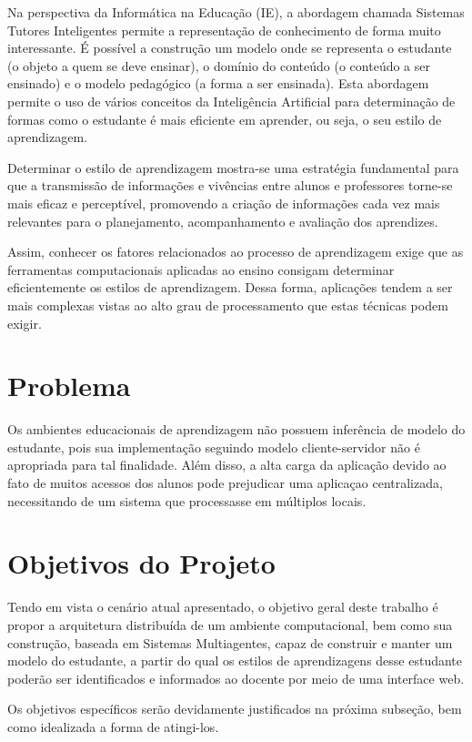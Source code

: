 Na perspectiva da Informática na Educação (IE), a abordagem chamada Sistemas Tutores Inteligentes permite a representação de conhecimento de forma muito interessante. É possível a construção um modelo onde se representa o estudante (o objeto a quem se deve ensinar), o domínio do conteúdo (o conteúdo a ser ensinado) e o modelo pedagógico (a forma a ser ensinada). Esta abordagem permite o uso de vários conceitos da Inteligência Artificial para determinação de formas como o estudante é mais eficiente em aprender, ou seja, o seu estilo de aprendizagem. 

Determinar o estilo de aprendizagem mostra-se uma estratégia fundamental para que a transmissão de informações e vivências entre alunos e professores torne-se mais eficaz e perceptível, promovendo a criação de informações cada vez mais relevantes para o planejamento, acompanhamento e avaliação dos aprendizes.

Assim, conhecer os fatores relacionados ao processo de aprendizagem exige que as ferramentas computacionais aplicadas ao ensino consigam determinar eficientemente os estilos de aprendizagem. Dessa forma, aplicações tendem a ser mais complexas vistas ao alto grau de processamento que estas técnicas podem exigir.

\section{Problema}
Os ambientes educacionais de aprendizagem não possuem inferência de modelo do estudante, pois sua implementação seguindo modelo cliente-servidor não é apropriada para tal finalidade. Além disso, a alta carga da aplicação devido ao fato de muitos acessos dos alunos pode prejudicar uma aplicaçao centralizada, necessitando de um sistema que processasse em múltiplos locais.

\section{Objetivos do Projeto}
Tendo em vista o cenário atual apresentado, o objetivo geral deste trabalho é propor a arquitetura distribuída de um ambiente computacional, bem como sua construção, baseada em Sistemas Multiagentes, capaz de construir e manter um modelo do estudante, a partir do qual os estilos de aprendizagens desse estudante poderão ser identificados e informados ao docente por meio de uma interface web.

Os objetivos específicos serão devidamente justificados na próxima subseção, bem como idealizada a forma de atingi-los.

